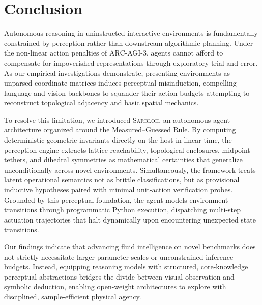 \section{Conclusion}
\label{sec:conclusion}

Autonomous reasoning in uninstructed interactive environments is fundamentally constrained by perception rather than downstream algorithmic planning. Under the non-linear action penalties of ARC-AGI-3, agents cannot afford to compensate for impoverished representations through exploratory trial and error. As our empirical investigations demonstrate, presenting environments as unparsed coordinate matrices induces perceptual misinduction, compelling language and vision backbones to squander their action budgets attempting to reconstruct topological adjacency and basic spatial mechanics.

To resolve this limitation, we introduced \textsc{Sarbloh}, an autonomous agent architecture organized around the Measured--Guessed Rule. By computing deterministic geometric invariants directly on the host in linear time, the perception engine extracts lattice reachability, topological enclosures, midpoint tethers, and dihedral symmetries as mathematical certainties that generalize unconditionally across novel environments. Simultaneously, the framework treats latent operational semantics not as brittle classifications, but as provisional inductive hypotheses paired with minimal unit-action verification probes. Grounded by this perceptual foundation, the agent models environment transitions through programmatic Python execution, dispatching multi-step actuation trajectories that halt dynamically upon encountering unexpected state transitions.

Our findings indicate that advancing fluid intelligence on novel benchmarks does not strictly necessitate larger parameter scales or unconstrained inference budgets. Instead, equipping reasoning models with structured, core-knowledge perceptual abstractions bridges the divide between visual observation and symbolic deduction, enabling open-weight architectures to explore with disciplined, sample-efficient physical agency.
